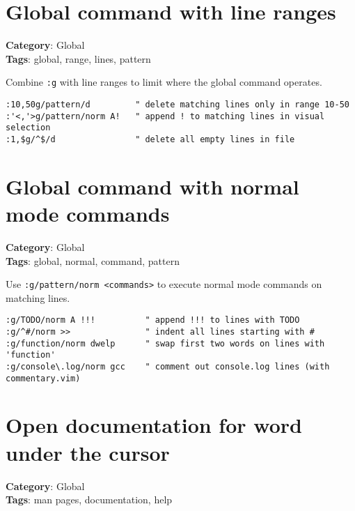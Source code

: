 {{{{{{\section{Global command with line ranges}

\textbf{Category}: Global\\ \textbf{Tags}: global, range, lines, pattern
\vspace{0.5cm}

Combine {\footnotesize \Verb§:g§} with line ranges to limit where the global command operates.

\begin{Exa*}{}
\begin{Verbatim}[fontsize=\footnotesize, breaklines, breakanywhere]
:10,50g/pattern/d         " delete matching lines only in range 10-50
:'<,'>g/pattern/norm A!   " append ! to matching lines in visual selection
:1,$g/^$/d                " delete all empty lines in file
\end{Verbatim}
\end{Exa*}

\section{Global command with normal mode commands}

\textbf{Category}: Global\\ \textbf{Tags}: global, normal, command, pattern
\vspace{0.5cm}

Use {\footnotesize \Verb§:g/pattern/norm <commands>§} to execute normal mode commands on matching lines.

\begin{Exa*}{}
\begin{Verbatim}[fontsize=\footnotesize, breaklines, breakanywhere]
:g/TODO/norm A !!!          " append !!! to lines with TODO
:g/^#/norm >>               " indent all lines starting with #
:g/function/norm dwelp      " swap first two words on lines with 'function'
:g/console\.log/norm gcc    " comment out console.log lines (with commentary.vim)
\end{Verbatim}
\end{Exa*}

\section{Open documentation for word under the cursor}

\textbf{Category}: Global\\ \textbf{Tags}: man pages, documentation, help
\vspace{0.5cm}

}}}}}}
